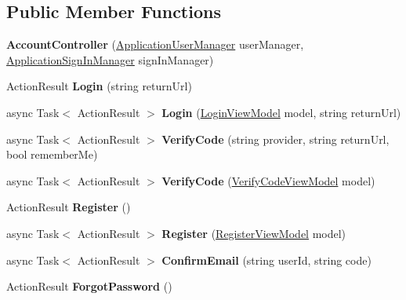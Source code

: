 \subsection*{Public Member Functions}
\begin{DoxyCompactItemize}
\item 
{\bfseries Account\+Controller} (\hyperlink{a00019}{Application\+User\+Manager} user\+Manager, \hyperlink{a00017}{Application\+Sign\+In\+Manager} sign\+In\+Manager)\hypertarget{a00007_a5985eb6e4a4ae7f4c874b1ccfba84c17}{}\label{a00007_a5985eb6e4a4ae7f4c874b1ccfba84c17}

\item 
Action\+Result {\bfseries Login} (string return\+Url)\hypertarget{a00007_a485bbeac01f2851f9c01803af4319301}{}\label{a00007_a485bbeac01f2851f9c01803af4319301}

\item 
async Task$<$ Action\+Result $>$ {\bfseries Login} (\hyperlink{a00131}{Login\+View\+Model} model, string return\+Url)\hypertarget{a00007_a26f5730053d2744a182135c0921104fb}{}\label{a00007_a26f5730053d2744a182135c0921104fb}

\item 
async Task$<$ Action\+Result $>$ {\bfseries Verify\+Code} (string provider, string return\+Url, bool remember\+Me)\hypertarget{a00007_a3aec70c240231aa01c2382636508129d}{}\label{a00007_a3aec70c240231aa01c2382636508129d}

\item 
async Task$<$ Action\+Result $>$ {\bfseries Verify\+Code} (\hyperlink{a00192}{Verify\+Code\+View\+Model} model)\hypertarget{a00007_a039a7401f9ec43263c2bc04509244fce}{}\label{a00007_a039a7401f9ec43263c2bc04509244fce}

\item 
Action\+Result {\bfseries Register} ()\hypertarget{a00007_a432c910f111e765a65da14282a223b23}{}\label{a00007_a432c910f111e765a65da14282a223b23}

\item 
async Task$<$ Action\+Result $>$ {\bfseries Register} (\hyperlink{a00172}{Register\+View\+Model} model)\hypertarget{a00007_aabe75cc491c52635d865e972992cf1d9}{}\label{a00007_aabe75cc491c52635d865e972992cf1d9}

\item 
async Task$<$ Action\+Result $>$ {\bfseries Confirm\+Email} (string user\+Id, string code)\hypertarget{a00007_a72e5d1891d8ecfd314e94e5c1b087da1}{}\label{a00007_a72e5d1891d8ecfd314e94e5c1b087da1}

\item 
Action\+Result {\bfseries Forgot\+Password} ()\hypertarget{a00007_aec786f07cb6404c6c604f8bdb0ebf146}{}\label{a00007_aec786f07cb6404c6c604f8bdb0ebf146}


\end{DoxyCompactItemize}
